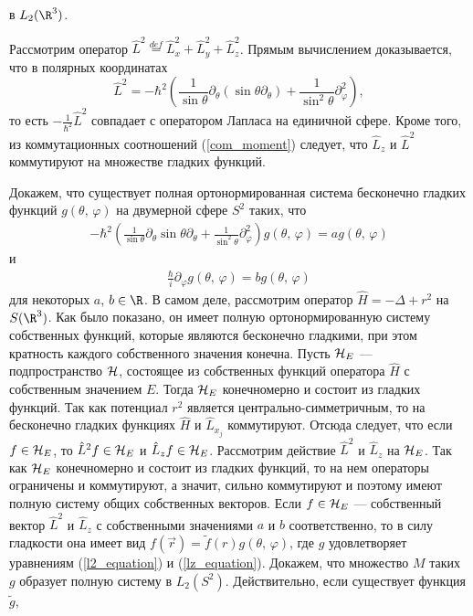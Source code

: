 \documentclass[a4paper
]{article}
\begin{document}
в $L_2(\R^3)$.\par
Рассмотрим оператор $\hat{L}^2\stackrel{def}{=}\hat{L}_x^2+\hat{L}_y^2
+\hat{L}_z^2$. Прямым вычислением доказывается, что в полярных координатах
$$\hat{L}^2=-\hbar^2\left(\frac{1}{\sin \theta}\partial_\theta(\sin \theta
\partial _\theta)+\frac{1}{\sin^2\theta}\partial^2_\varphi\right),$$
то есть $-\frac{1}{\hbar^2}\hat{L}^2$ совпадает с оператором Лапласа
на единичной сфере. Кроме того, из коммутационных соотношений
(\ref{com_moment}) следует, что $\hat{L}_z$ и $\hat{L}^2$ коммутируют
на множестве гладких функций. \par
Докажем, что существует полная ортонормированная система бесконечно
гладких функций $g(\theta, \, \varphi)$ на двумерной сфере $S^2$ таких,
что
\begin{align}
\label{l2_equation}
-\hbar^2\left(\frac{1}{\sin \theta}\partial_\theta\sin \theta
\partial _\theta+\frac{1}{\sin^2\theta}\partial^2_\varphi\right)
g(\theta, \, \varphi)=ag(\theta, \, \varphi)
\end{align}
и
\begin{align}
\label{lz_equation}
\frac{\hbar}{i}\partial
_\varphi g(\theta, \, \varphi)=bg(\theta, \, \varphi)
\end{align}
для некоторых $a$, $b\in \R$. В самом деле, рассмотрим оператор
$\hat H=-\Delta+r^2$ на $S(\R^3)$. Как было показано, он имеет полную
ортонормированную систему собственных функций, которые являются бесконечно
гладкими, при этом кратность каждого собственного значения конечна.
Пусть ${\cal H}_E$ --- подпространство ${\cal H}$, состоящее из
собственных функций оператора $\hat H$ с собственным значением $E$.
Тогда ${\cal H}_E$ конечномерно и состоит из гладких функций.
Так как потенциал $r^2$ является центрально-симметричным, то на
бесконечно гладких функциях $\hat H$ и $\hat L_{x_j}$ коммутируют. Отсюда
следует, что если $f\in {\cal H}_E$, то $\hat L^2f\in {\cal H}_E$ и
$\hat L_zf\in {\cal H}_E$. Рассмотрим действие $\hat L^2$ и $\hat L_z$
на ${\cal H}_E$. Так как ${\cal H}_E$ конечномерно и состоит из гладких
функций, то на нем операторы ограничены и коммутируют, а значит,
сильно коммутируют и поэтому имеют полную систему общих собственных
векторов. Если $f\in {\cal H}_E$ --- собственный вектор $\hat L^2$ и
$\hat L_z$ с собственными значениями $a$ и $b$ соответственно, то
в силу гладкости она имеет вид $f(\vec r)=\tilde f(r)g(\theta, \, \varphi)$,
где $g$ удовлетворяет уравнениям (\ref{l2_equation}) и (\ref{lz_equation}).
Докажем, что множество $M$ таких $g$ образует полную
систему в $L_2(S^2)$. Действительно, если существует функция $\tilde g$,
\end{document}
